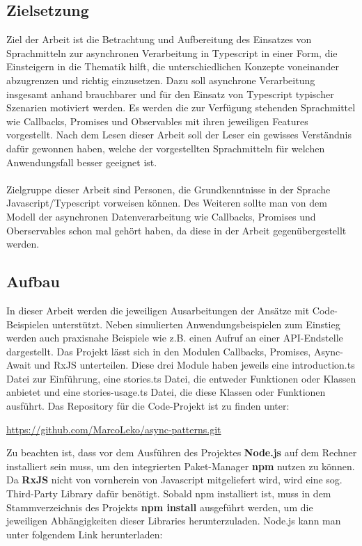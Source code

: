 \subsection{Zielsetzung}

Ziel der Arbeit ist die Betrachtung und Aufbereitung des Einsatzes von Sprachmitteln zur asynchronen Verarbeitung in Typescript in einer Form, die Einsteigern in die Thematik hilft, die unterschiedlichen Konzepte voneinander abzugrenzen und richtig einzusetzen. Dazu soll asynchrone Verarbeitung insgesamt anhand brauchbarer und für den Einsatz von Typescript typischer Szenarien motiviert werden. Es werden die zur Verfügung stehenden Sprachmittel wie Callbacks, Promises und Observables mit ihren jeweiligen Features vorgestellt. Nach dem Lesen dieser Arbeit soll der Leser ein gewisses Verständnis dafür gewonnen haben, welche der vorgestellten Sprachmitteln für welchen Anwendungsfall besser geeignet ist.\\\\

\noindent
Zielgruppe dieser Arbeit sind Personen, die Grundkenntnisse in der Sprache Javascript/Typescript vorweisen können. Des Weiteren sollte man von dem Modell der asynchronen Datenverarbeitung wie Callbacks, Promises und Oberservables schon mal gehört haben, da diese in der Arbeit gegenübergestellt werden.

\subsection{Aufbau}

In dieser Arbeit werden die jeweiligen Ausarbeitungen der Ansätze mit Code-Beispielen unterstützt. Neben simulierten Anwendungsbeispielen zum Einstieg werden auch praxisnahe Beispiele wie z.B. einen Aufruf an einer API-Endstelle dargestellt. Das Projekt lässt sich in den Modulen Callbacks, Promises, Async-Await und RxJS unterteilen. Diese drei Module haben jeweils eine introduction.ts Datei zur Einführung, eine stories.ts Datei, die entweder Funktionen oder Klassen anbietet und eine stories-usage.ts Datei, die diese Klassen oder Funktionen ausführt. Das Repository für die Code-Projekt ist zu finden unter: 

\begin{center}
\url{https://github.com/MarcoLeko/async-patterns.git}
\end{center}

\noindent
Zu beachten ist, dass vor dem Ausführen des Projektes \textbf{Node.js} auf dem Rechner installiert sein muss, um den integrierten Paket-Manager \textbf{npm} nutzen zu können. Da \textbf{RxJS} nicht von vornherein von Javascript mitgeliefert wird, wird eine sog. \glqq Third-Party Library\grqq{} dafür benötigt. Sobald npm installiert ist, muss in dem Stammverzeichnis des Projekts \textbf{npm install} ausgeführt werden, um die jeweiligen Abhängigkeiten dieser Libraries herunterzuladen. Node.js kann man unter folgendem Link herunterladen:

